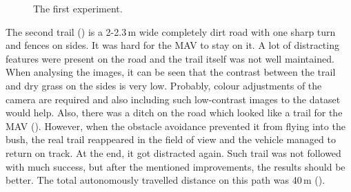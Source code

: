 \begin{figure}[!h]

  \centering

  \centering	
  


  \caption{The first experiment.}
  \label{fig:first_trail_photos}
\end{figure}


The second trail () is a 2-2.3\,m wide completely dirt road with one sharp turn and fences on sides. It was hard for the \acs{MAV} to stay on it. A lot of distracting features were present on the road and the trail itself was not well maintained. When analysing the images, it can be seen that the contrast between the trail and dry grass on the sides is very low. Probably, colour adjustments of the camera are required and also including such low-contrast images to the dataset would help. Also, there was a ditch on the road which looked like a trail for the \acs{MAV} (). However, when the obstacle avoidance prevented it from flying into the bush, the real trail reappeared in the field of view and the vehicle managed to return on track. At the end, it got distracted again. Such trail was not followed with much success, but after the mentioned improvements, the results should be better. The total autonomously travelled distance on this path was 40\,m ().


